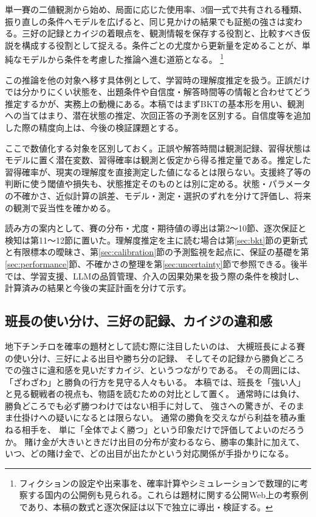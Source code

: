 \documentclass[11pt,a4paper]{article}
\numberwithin{equation}{section}
\begin{document}
単一賽の二値観測から始め、局面に応じた使用率、3個一式で共有される種類、振り直しの条件へモデルを広げると、同じ見かけの結果でも証拠の強さは変わる。三好の記録とカイジの着眼点を、観測情報を保存する役割と、比較すべき仮説を構成する役割として捉える。条件ごとの尤度から更新量を定めることが、単純なモデルから条件を考慮した推論へ進む道筋となる。
\footnote{フィクションの設定や出来事を、確率計算やシミュレーションで数理的に考察する国内の公開例も見られる\cite{mike2014,nemuru2020}。これらは題材に関する公開Web上の考察例であり、本稿の数式と逐次保証は以下で独立に導出・検証する。}

この推論を他の対象へ移す具体例として、学習時の理解度推定を扱う。正誤だけでは分かりにくい状態を、出題条件や自信度・解答時間等の情報と合わせてどう推定するかが、実務上の動機にある。本稿ではまずBKTの基本形を用い、観測への当てはまり、潜在状態の推定、次回正答の予測を区別する。自信度等を追加した際の精度向上は、今後の検証課題とする。

ここで数値化する対象を区別しておく。正誤や解答時間は観測記録、習得状態はモデルに置く潜在変数、習得確率は観測と仮定から得る推定量である。推定した習得確率が、現実の理解度を直接測定した値になるとは限らない。支援終了等の判断に使う閾値や損失も、状態推定そのものとは別に定める。状態・パラメータの不確かさ、近似計算の誤差、モデル・測定・選択のずれを分けて評価し、将来の観測で妥当性を確かめる。

読み方の案内として、賽の分布・尤度・期待値の導出は第2〜10節、逐次保証と検知は第11〜12節に置いた。理解度推定を主に読む場合は第\ref{sec:bkt}節の更新式と有限標本の曖昧さ、第\ref{sec:calibration}節の予測監視を起点に、保証の基礎を第\ref{sec:performance}節、不確かさの整理を第\ref{sec:uncertainty}節で参照できる。後半では、学習支援、LLMの品質管理、介入の因果効果を扱う際の条件を検討し、計算済みの結果と今後の実証計画を分けて示す。

\subsection{班長の使い分け、三好の記録、カイジの違和感}
地下チンチロを確率の題材として読む際に注目したいのは、
大槻班長による賽の使い分け、三好による出目や勝ち分の記録、
そしてその記録から勝負どころでの強さに違和感を見いだすカイジ、というつながりである\cite{kaiji}。
その周囲には、「ざわざわ」と勝負の行方を見守る人々もいる。
本稿では、班長を「強い人」と見る観戦者の視点も、物語を読むための対比として置く。
通常時には負け、勝負どころでも必ず勝つわけではない相手に対して、
強さへの驚きが、そのまま仕掛けへの疑いになるとは限らない。
通常の勝負を交えながら利益を積み重ねる相手を、
単に「全体でよく勝つ」という印象だけで評価してよいのだろうか。
賭け金が大きいときだけ出目の分布が変わるなら、勝率の集計に加えて、
いつ、どの賭け金で、どの出目が出たかという対応関係が手掛かりになる。
\end{document}
